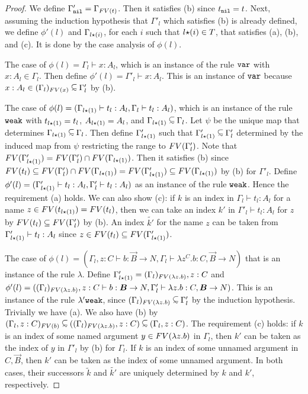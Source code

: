 \begin{proof}
  We define $\Gamma'_{{\tt nil}} = \Gamma_{{{\relax FV}}(t)}$.
  Then it satisfies (b) since $t_{\tt nil} = t$. 
  Next, assuming the induction hypothesis that $\Gamma'_l$ which satisfies (b)
  is already defined, 
  we define $\phi'(l)$ and $\Gamma_{l{\star}(i)}$, 
  for each $i$ such that $l{\star}(i)\in T$, 
  that satisfies (a), (b), and (c). 
  It is done by the case analysis of $\phi(l)$.

  The case of $\phi(l) = \Gamma_l\vdash x:A_l$,
  which is an instance of the rule ${\tt var}$ with $x:A_l\in\Gamma_l$. 
  Then define $\phi'(l) = \Gamma'_l\vdash x:A_l$. This is an instance of ${\tt var}$
  because $x:A_l \in \Restrict{(\Gamma_l)}{\FV(x)} \subseteqsim \Gamma'_l$ by (b).

  The case of $\phi(l) = (\Gamma_{l{\star}(1)}\vdash t_l:A_l,\Gamma_{l}\vdash t_l:A_l)$,
  which is an instance of the rule ${\tt weak}$ with
  $t_{l{\star}(1)} = t_l$, $A_{l{\star}(1)} = A_{l}$, and
  $\Gamma_{l\conc(1)}\subseteqsim \Gamma_l$.
  Let $\psi$ be the unique map that determines $\Gamma_{l\conc(1)}\subseteqsim \Gamma_l$.
  Then define $\Gamma'_{l{\star}(1)}$ such that
  $\Gamma'_{l\conc(1)}\subseteqsim \Gamma'_l$ determined by
  the induced map from $\psi$ restricting the range to ${{\relax FV}}(\Gamma'_l)$.
  Note that ${{\relax FV}}(\Gamma'_{l{\star}(1)}) = {{\relax FV}}(\Gamma'_l)\cap{{\relax FV}}(\Gamma_{l{\star}(1)})$. 
  Then it satisfies (b) since ${{\relax FV}}(t_l)\subseteq {{\relax FV}}(\Gamma'_l) \cap {{\relax FV}}(\Gamma_{l{\star}(1)}) = {{\relax FV}}(\Gamma'_{l{\star}(1)}) \subseteq {{\relax FV}}(\Gamma_{l{\star}(1)})$ by (b) for $\Gamma'_l$.
  Define $\phi'(l) = (\Gamma'_{l{\star}(1)}\vdash t_l:A_l,\Gamma'_{l}\vdash t_l:A_l)$
  as an instance of the rule ${\tt weak}$. 
  Hence the requirement (a) holds.
  We can also show (c): if $k$ is an index in $\Gamma_l\vdash t_l:A_l$ for a name
  $z\in{{\relax FV}}(t_{l{\star}(1)}) = {{\relax FV}}(t_l)$, then we can take an index $k'$
  in $\Gamma'_l\vdash t_l:A_l$ for $z$ by ${{\relax FV}}(t_l)\subseteq{{\relax FV}}(\Gamma'_l)$ by (b). 
  An index $\tilde{k'}$ for the name $z$ can be taken
  from $\Gamma'_{l{\star}(1)}\vdash t_l:A_l$
  since $z \in {{\relax FV}}(t_l) \subseteq {{\relax FV}}(\Gamma'_{l{\star}(1)})$. 
  
  The case of $\phi(l) = (\Gamma_l,z:C\vdash b:\vec{B}\to N, \Gamma_l\vdash\lambda z^C.b:C,\vec{B}\to N)$
  that is an instance of the rule $\lambda$. 
  Define $\Gamma'_{l{\star}(1)} = (\Gamma_l)_{{{\relax FV}}(\lambda z.b)},z:C$ and 
  $\phi'(l) = (\Restrict{(\Gamma_l)}{\FV(\lambda z.b)},z:C\vdash b:\vec{B}\to N, \Gamma'_l\vdash \lambda z.b:C,\vec{B}\to N)$. 
  This is an instance of the rule $\lambda'{\tt weak}$, since $\Restrict{(\Gamma_l)}{\FV(\lambda z.b)}\subseteqsim \Gamma'_l$ by the induction hypothesis.
  Trivially we have (a). 
  We also have (b) by $\Restrict{(\Gamma_l,z:C)}{\FV(b)} \subseteqsim (\Restrict{(\Gamma_l)}{\FV(\lambda z.b)},z:C) \subseteqsim (\Gamma_l,z:C)$.   
  The requirement (c) holds: 
  if $k$ is an index of some named argument $y\in{{\relax FV}}(\lambda z.b)$ in $\Gamma_l$,
  then $k'$ can be taken as the index of $y$ in $\Gamma'_l$ by (b) for $\Gamma_l$.
  If $k$ is an index of some unnamed argument in $C,\vec{B}$,
  then $k'$ can be taken as the index of some unnamed argument. 
  In both cases, their successors $\tilde{k}$ and $\tilde{k'}$ are uniquely
  determined by $k$ and $k'$, respectively. 
  

\end{proof}
